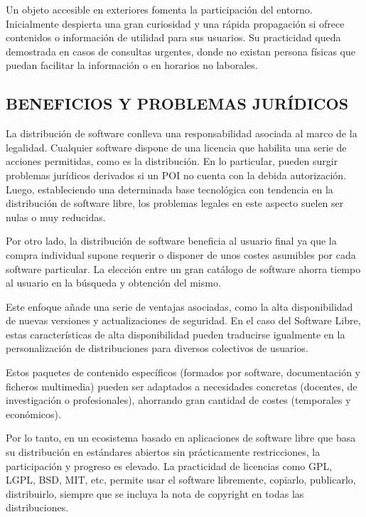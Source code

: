 Un objeto accesible en exteriores fomenta la participación del entorno.
Inicialmente despierta una gran curiosidad y una rápida propagación si ofrece
contenidos o información de utilidad para sus usuarios. Su practicidad queda
demostrada en casos de consultas urgentes, donde no existan persona físicas 
que puedan facilitar la información o en horarios no laborales.

\subsection{\uppercase{Beneficios y problemas jurídicos}}

La distribución de software conlleva una
responsabilidad asociada al marco de la legalidad. Cualquier software 
dispone de una licencia que habilita una serie de acciones permitidas, 
como es la distribución. En lo particular,
pueden surgir problemas jurídicos derivados si un POI no cuenta con la
debida autorización. Luego, estableciendo una determinada base tecnológica
con tendencia en la distribución de software libre, los problemas
legales en este aspecto suelen ser nulas o muy reducidas.

Por otro lado, la distribución de software beneficia al usuario final
ya que la compra individual supone requerir o disponer de unos costes
asumibles por cada software particular. La elección
entre un gran catálogo de software ahorra tiempo al usuario en la
búsqueda y obtención del mismo.

Este enfoque añade una serie de ventajas asociadas, como la alta
disponibilidad de nuevas versiones y actualizaciones de seguridad.
En el caso del Software Libre, estas características de alta
disponibilidad pueden traducirse igualmente en la personalización
de distribuciones para diversos colectivos de usuarios. 

\newpage

Estos paquetes de contenido específicos (formados por software,
documentación y ficheros multimedia) pueden ser adaptados a
necesidades concretas (docentes, de investigación o profesionales),
ahorrando gran cantidad de costes (temporales y económicos).

Por lo tanto, en un ecosistema basado en aplicaciones de software libre
que basa su distribución en estándares abiertos sin prácticamente
restricciones, la participación y progreso es elevado.
La practicidad de licencias como \acs{GPL}\label{acro:GPL},
\acs{LGPL}\label{acro:LGPL}, \acs{BSD}\label{acro:BSD},
\acs{MIT}\label{acro:MIT}, etc, permite usar el software libremente, copiarlo,
publicarlo, distribuirlo, siempre que se incluya la nota de copyright en todas las distribuciones.


